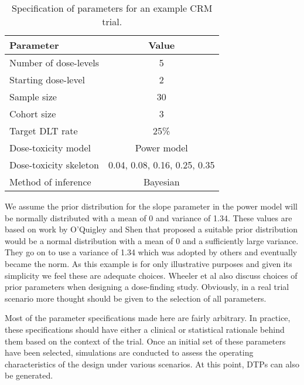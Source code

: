 \begin{table}[h!]
	\centering
	\caption{Specification of parameters for an example CRM trial. }
	\label{tab_tite-dtp:exampleCRMspecs}
	\begin{tabular}{l|c}
		\hline
		\textbf{Parameter}     & \textbf{Value}               \\ \hline
		Number of dose-levels  & 5                            \\
		Starting dose-level    & 2                            \\
		Sample size            & 30                           \\
		Cohort size            & 3                            \\
		Target DLT rate        & 25\%                         \\
		Dose-toxicity model    & Power model                  \\
		Dose-toxicity skeleton & 0.04, 0.08, 0.16, 0.25, 0.35 \\
		Method of inference    & Bayesian                     \\ \hline
	\end{tabular}
\end{table}

We assume the prior distribution for the slope parameter in the power model will be normally distributed with a mean of 0 and variance of 1.34. These values are based on work by O'Quigley and Shen \cite{oquigleyContinualReassessmentMethod1996} that proposed a suitable prior distribution would be a normal distribution with a mean of 0 and a sufficiently large variance. They go on to use a variance of 1.34 which was adopted by others and eventually became the norm. As this example is for only illustrative purposes and given its simplicity we feel these are adequate choices. Wheeler et al \cite{wheelerHowDesignDosefinding2019} also discuss choices of prior parameters when designing a dose-finding study. Obviously, in a real trial scenario more thought should be given to the selection of all parameters. 

Most of the parameter specifications made here are fairly arbitrary. In practice, these specifications should have either a clinical or statistical rationale behind them based on the context of the trial. Once an initial set of these parameters have been selected, simulations are conducted to assess the operating characteristics of the design under various scenarios. At this point, DTPs can also be generated. 

